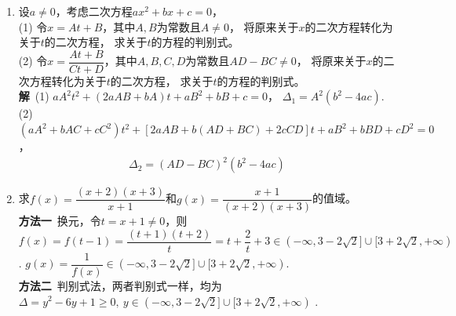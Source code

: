 \begin{enumerate}[label={【\textbf{例\thechapter.\arabic*}】},
 leftmargin=\inteval{\myenumleftmargin}pt,
 itemsep=\inteval{\myenumitempsep}pt,
 itemindent=\inteval{\myenumitemindent}pt]
\item 设$a\neq 0$，考虑二次方程$ax^2+bx+c=0$，\\
(1) 令$x=At+B$，其中$A,B$为常数且$A\neq0$，
将原来关于$x$的二次方程转化为关于$t$的二次方程，
求关于$ t $的方程的判别式。\\
(2) 令$x=\dfrac{At+B}{Ct+D}$，其中$A,B,C,D$为常数且$AD-BC\neq0$，
将原来关于$x$的二次方程转化为关于$t$的二次方程，
求关于$ t $的方程的判别式。\\
\textbf{解}\ (1) $aA^2t^2+(2aAB+bA)t+aB^2+bB+c=0$，
$\Delta_1=A^2(b^2-4ac)$. \\
(2) $ (aA^2+bAC+cC^2)t^2+[2aAB+b(AD+BC)+2cCD]t+aB^2+bBD+cD^2=0 $，
\begin{gather}\label{二次方程分式线性变换}
    \Delta_2=(AD-BC)^2(b^2-4ac)
\end{gather} 

\item 求$ f(x)=\dfrac{(x+2)(x+3)}{x+1} $和$ g(x)=\dfrac{x+1}{(x+2)(x+3)} $的值域。\\
\textbf{方法一}\ 换元，令$ t=x+1\neq 0 $，则$ f(x)=f(t-1)=\dfrac{(t+1)(t+2)}{t}=t+
\dfrac{2}{t}+3\in (-\infty,3-2\sqrt{2}]\cup [3+2\sqrt{2},+\infty) $. 
$ g(x)=\dfrac{1}{f(x)}\in (-\infty,3-2\sqrt{2}]\cup [3+2\sqrt{2},+\infty) $. \\
\textbf{方法二}\ 判别式法，两者判别式一样，均为$ \Delta=y^2-6y+1\geq 0,\ y
\in (-\infty,3-2\sqrt{2}]\cup [3+2\sqrt{2},+\infty) $ .


\end{enumerate}
